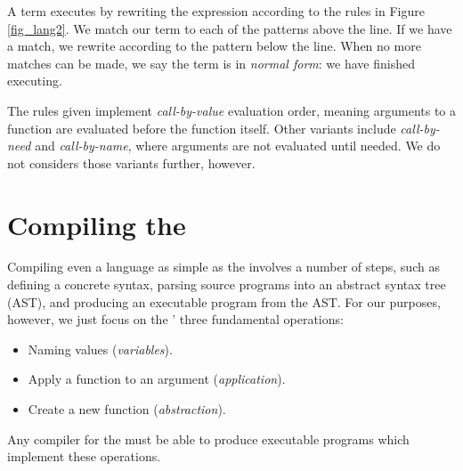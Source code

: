 \documentclass[12pt]{report}
\begin{document}
A \lamA term executes by rewriting the expression according to the
rules in Figure \ref{fig_lang2}. We match our term to each of the
patterns above the line. If we have a match, we rewrite according to
the pattern below the line. When no more matches can be made, we say
the term is in \emph{normal form}: we have finished executing.

The rules given implement \emph{call-by-value} evaluation order,
meaning arguments to a function are evaluated before the function
itself. Other variants include \emph{call-by-need} and
\emph{call-by-name}, where arguments are not evaluated until
needed. We do not considers those variants further, however.

\section{Compiling the \LamA}
\label{sec_lang1}

Compiling even a language as simple as the \lamA involves a number of
steps, such as defining a concrete syntax, parsing source programs
into an abstract syntax tree (AST), and producing an executable
program from the AST. For our purposes, however, we just focus on the
\lamA' three fundamental operations:

\begin{itemize}
\item Naming values (\emph{variables}).
\item Apply a function to an argument (\emph{application}).
\item Create a new function (\emph{abstraction}). 
\end{itemize}

Any compiler for the \lamA must be able to produce executable programs
which implement these operations. 

\end{document}
